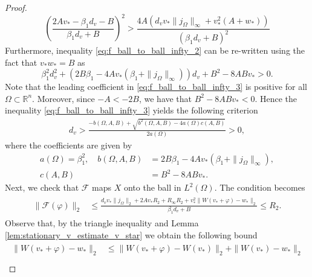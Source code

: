 \documentclass[11pt, a4paper]{article}
\theoremstyle{break}
\theoremstyle{break}
\theoremstyle{break}
\theoremstyle{break}
\theoremstyle{break}
\theoremstyle{break}
\theoremstyle{break}
\begin{document}
\begin{proof}
    \begin{equation}
        \label{eq:f_ball_to_ball_infty_2}
        \left( \frac{ 2 A v_* - \beta_1 d_v - B}{ \beta_1 d_v + B}\right)^2
        >
        \frac{4A \left( d_v v_* \|j_\Omega\|_\infty + v_*^2(A + w_* )\right)}{(\beta_1 d_v + B)^2}
    \end{equation}
    Furthermore, inequality \eqref{eq:f_ball_to_ball_infty_2} can be re-written using the fact that $v_*w_* = B$ as
    \begin{equation}
        \label{eq:f_ball_to_ball_infty_3}
        \beta_1^2 d_v^2 +
        \left( 2B\beta_1 - 4Av_*(\beta_1 + \|j_\Omega\|_\infty) \right) d_v  +
        B^2 - 8 AB v_*
        >
        0.
    \end{equation}
    Note that the leading coefficient in \eqref{eq:f_ball_to_ball_infty_3} is positive for all $\Omega \subset \mathbb{R}^n$. Moreover, since $- A < -2B$, we have that $B^2 - 8 ABv_* < 0$. Hence the inequality \eqref{eq:f_ball_to_ball_infty_3} yields the following criterion
    \begin{align}
        \label{eq:d_v_lowerbound_1}
        d_v > 
        \frac{-b(\Omega, A, B) + \sqrt{b^2(\Omega, A, B) - 4 a(\Omega)c(A, B)}}{2 a(\Omega)} > 0,
    \end{align}
    where the coefficients are given by
    \begin{align*}
        a(\Omega) = \beta_1^2, \quad
        b(\Omega, A, B) &= 2B\beta_1 - 4Av_*(\beta_1 + \|j_\Omega\|_\infty) , \\
        c(A, B) &= B^2 - 8 AB v_*.
    \end{align*}
    Next, we check that $\mathcal{F}$ maps $X$ onto the ball in $L^2(\Omega)$. The condition becomes
    \begin{align}
        \label{eq:f_ball_to_ball_l2_1}
        \begin{split}
            \|\mathcal{F}(\varphi)\|_2
            &\leq
            \frac{d_v v_*\|j_\Omega\|_2 + 2 A v_* R_2 + R_\infty R_2 + v_*^2  \|W(v_* + \varphi) - w_*\|_2 }{ \beta_1 d_v + B} 
            \leq R_2.
        \end{split}
    \end{align}
    Observe that, by the triangle inequality and Lemma \ref{lem:stationary_v_estimate_v_star} we obtain the following bound
    \begin{align}
    \label{eq:perturbed_W_star_w_diff_l2_estimate}
        \begin{split}
            \|W(v_* + \varphi) - w_*\|_2 
            &\leq \|W(v_* + \varphi) - W(v_*)\|_2 + \|W(v_*) - w_*\|_2 \\

\end{split}
\end{align}
\end{proof}
\end{document}
